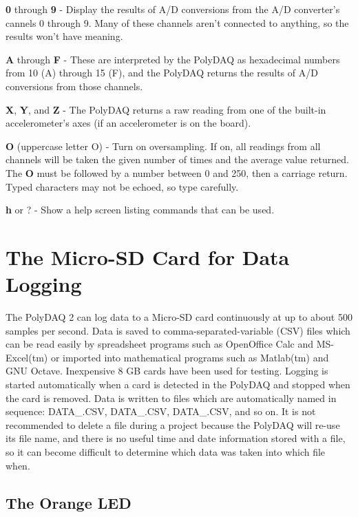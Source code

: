 \begin{DoxyItemize}
\item {\bfseries 0} through {\bfseries 9} -\/ Display the results of A/\-D conversions from the A/\-D converter's cannels 0 through 9. Many of these channels aren't connected to anything, so the results won't have meaning.
\item {\bfseries A} through {\bfseries F} -\/ These are interpreted by the Poly\-D\-A\-Q as hexadecimal numbers from 10 (A) through 15 (F), and the Poly\-D\-A\-Q returns the results of A/\-D conversions from those channels.
\item {\bfseries X}, {\bfseries Y}, and {\bfseries Z} -\/ The Poly\-D\-A\-Q returns a raw reading from one of the built-\/in accelerometer's axes (if an accelerometer is on the board).
\item {\bfseries O} (uppercase letter O) -\/ Turn on oversampling. If on, all readings from all channels will be taken the given number of times and the average value returned. The {\bfseries O} must be followed by a number between 0 and 250, then a carriage return. Typed characters may not be echoed, so type carefully.
\item {\bfseries h} or {\bfseries }? -\/ Show a help screen listing commands that can be used.
\end{DoxyItemize}\hypertarget{pd_setup_pds_sd_card}{}\section{The Micro-\/\-S\-D Card for Data Logging}\label{pd_setup_pds_sd_card}
The Poly\-D\-A\-Q 2 can log data to a Micro-\/\-S\-D card continuously at up to about 500 samples per second. Data is saved to comma-\/separated-\/variable (C\-S\-V) files which can be read easily by spreadsheet programs such as Open\-Office Calc and M\-S-\/\-Excel(tm) or imported into mathematical programs such as Matlab(tm) and G\-N\-U Octave. Inexpensive 8 G\-B cards have been used for testing. Logging is started automatically when a card is detected in the Poly\-D\-A\-Q and stopped when the card is removed. Data is written to files which are automatically named in sequence\-: {\ttfamily D\-A\-T\-A\-\_.\-C\-S\-V}, {\ttfamily D\-A\-T\-A\-\_.\-C\-S\-V}, {\ttfamily D\-A\-T\-A\-\_.\-C\-S\-V}, and so on. It is not recommended to delete a file during a project because the Poly\-D\-A\-Q will re-\/use its file name, and there is no useful time and date information stored with a file, so it can become difficult to determine which data was taken into which file when.\hypertarget{pd_setup_pds_sd_led}{}\subsection{The Orange L\-E\-D}\label{pd_setup_pds_sd_led}
